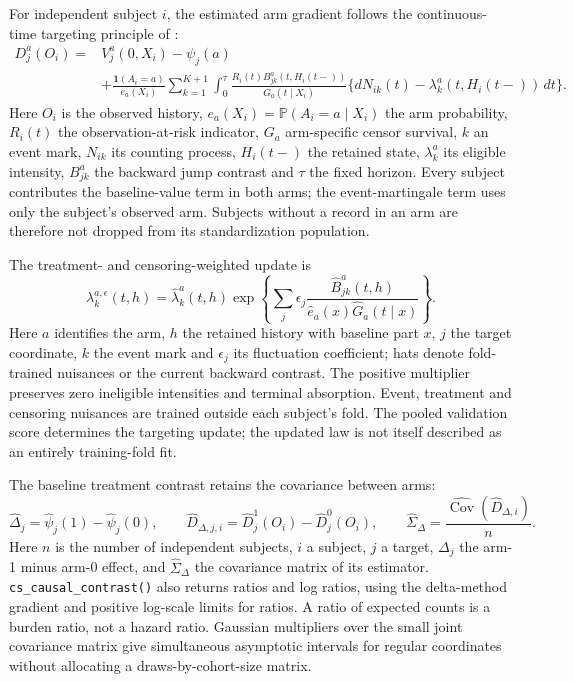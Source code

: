 \documentclass[article,nojss]{jss}
\newcommand{\code}[1]{\texttt{#1}}
\newcommand{\Prb}{\mathbb{P}}
\begin{document}
For independent subject $i$, the estimated arm gradient follows the continuous-time targeting principle of \citet{Rytgaard2022}:
\begin{equation}\label{eq:causal_eif}
 \begin{aligned}
 D_j^a(O_i)={}&V_j^a(0,X_i)-\psi_j(a)\\
 &+\frac{\mathbf{1}(A_i=a)}{e_a(X_i)}
 \sum_{k=1}^{K+1}\int_0^\tau
 \frac{R_i(t)B_{jk}^a(t,H_i(t-))}{G_a(t\mid X_i)}
 \{dN_{ik}(t)-\lambda_k^a(t,H_i(t-))\,dt\}.
 \end{aligned}
\end{equation}
Here $O_i$ is the observed history, $e_a(X_i)=\Prb(A_i=a\mid X_i)$ the arm probability, $R_i(t)$ the observation-at-risk indicator, $G_a$ arm-specific censor survival, $k$ an event mark, $N_{ik}$ its counting process, $H_i(t-)$ the retained state, $\lambda_k^a$ its eligible intensity, $B_{jk}^a$ the backward jump contrast and $\tau$ the fixed horizon. Every subject contributes the baseline-value term in both arms; the event-martingale term uses only the subject's observed arm. Subjects without a record in an arm are therefore not dropped from its standardization population.

The treatment- and censoring-weighted update is
\begin{equation}\label{eq:causal_tilt}
 \lambda_k^{a,\epsilon}(t,h)=\widehat\lambda_k^a(t,h)
 \exp\!\left\{\sum_j\epsilon_j
 \frac{\widehat B_{jk}^a(t,h)}{\widehat e_a(x)\widehat G_a(t\mid x)}\right\}.
\end{equation}
Here $a$ identifies the arm, $h$ the retained history with baseline part $x$, $j$ the target coordinate, $k$ the event mark and $\epsilon_j$ its fluctuation coefficient; hats denote fold-trained nuisances or the current backward contrast. The positive multiplier preserves zero ineligible intensities and terminal absorption. Event, treatment and censoring nuisances are trained outside each subject's fold. The pooled validation score determines the targeting update; the updated law is not itself described as an entirely training-fold fit.

The baseline treatment contrast retains the covariance between arms:
\begin{equation}\label{eq:causal_contrast}
 \widehat\Delta_j=\widehat\psi_j(1)-\widehat\psi_j(0),\qquad
 \widehat D_{\Delta,j,i}=\widehat D_j^1(O_i)-\widehat D_j^0(O_i),\qquad
 \widehat\Sigma_\Delta=\frac{\widehat{\operatorname{Cov}}(\widehat D_{\Delta,i})}{n}.
\end{equation}
Here $n$ is the number of independent subjects, $i$ a subject, $j$ a target, $\Delta_j$ the arm-1 minus arm-0 effect, and $\widehat\Sigma_\Delta$ the covariance matrix of its estimator. \code{cs\_causal\_contrast()} also returns ratios and log ratios, using the delta-method gradient and positive log-scale limits for ratios. A ratio of expected counts is a burden ratio, not a hazard ratio. Gaussian multipliers over the small joint covariance matrix give simultaneous asymptotic intervals for regular coordinates without allocating a draws-by-cohort-size matrix.
\end{document}
